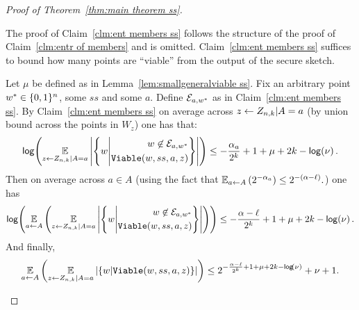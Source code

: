\begin{proof}[Proof of Theorem~\ref{thm:main theorem ss}]
\begin{claim}
\label{clm:ent members ss}
\end{claim}
The proof of Claim~\ref{clm:ent members ss} follows the structure of the proof of Claim~\ref{clm:entr of members} and is omitted. 
Claim~\ref{clm:ent members ss} suffices to bound how many points are ``viable'' from the output of the secure sketch.

\begin{corollary}
\label{corollary:info loss ss}
Let $\mu$ be defined as in Lemma~\ref{lem:smallgeneralviable ss}.  Fix an arbitrary point $w^*\in \{0, 1\}^n$, some $ss$ and some $a$. Define $\mathcal{E}_{a,w^*}$ as in Claim~\ref{clm:ent members ss}.  By Claim~\ref{clm:ent members ss} on average across $z\leftarrow Z_{n,k}| A=a$ (by union bound across the points in $W_z$) one has that:
\begin{align*}
\mathsf{log}\!\left(\operatorname*{\mathbb{E}}_{z\leftarrow Z_{n,k}| A=a} \left|\left\{ 
w\middle| \begin{aligned} w\not\in \mathcal{E}_{a, w^*} \\\mathtt{Viable}(w,ss, a, z)\end{aligned} \right\} \right|\right) \le -\frac{\alpha_a}{2^k}+1+\mu+2k-\mathsf{log}\!\left(\nu\right).
\end{align*}
Then on average across $a\in A$ (using the fact that $\operatorname*{\mathbb{E}}_{a\leftarrow A} \left(2^{-\alpha_a} \right) \le 2^{-(\alpha-\ell)}.$) one has 
\begin{align*}
\mathsf{log}\!\left(\operatorname*{\mathbb{E}}_{a\leftarrow A}\left(\operatorname*{\mathbb{E}}_{z\leftarrow Z_{n,k}| A=a} \left|\left\{ 
w\middle| \begin{aligned} w\not\in \mathcal{E}_{a, w^*} \\\mathtt{Viable}(w,ss, a, z)\end{aligned} \right\} \right| \right)\right)\le -\frac{\alpha-\ell}{2^k}+1+\mu+2k-\mathsf{log}\!\left(\nu\right).
\end{align*}
And finally, 
\begin{align*}
\operatorname*{\mathbb{E}}_{a\leftarrow A}\left(\operatorname*{\mathbb{E}}_{z\leftarrow Z_{n,k}| A=a} \left|\left\{ 
w\middle|\mathtt{Viable}(w, ss, a, z)\right\} \right| \right)\le 2^{-\frac{\alpha-\ell}{2^k}+1+\mu+2k-\mathsf{log}\!\left(\nu\right)}+\nu+1.
\end{align*}
\end{corollary}


\end{proof}

